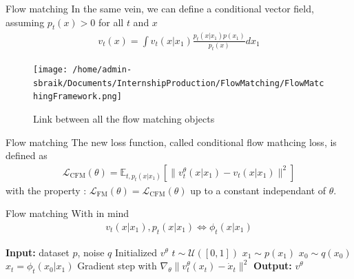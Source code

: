 \documentclass{beamer}
\begin{document}
\begin{frame}{Flow matching}
    In the same vein, we can define a conditional vector field, assuming \(p_t(x)>0\) for all \(t\) and \(x\)
    \begin{align}
        v_t(x)=\int v_t(x|x_1)\frac{p_t(x|x_1)p(x_1)}{p_t(x)}dx_1
    \end{align}
\end{frame}

\begin{frame}
\begin{figure}
    \centering
    \texttt{[image: /home/admin-sbraik/Documents/InternshipProduction/FlowMatching/FlowMatchingFramework.png]}
    \caption{Link between all the flow matching objects}
    \label{fig:flow_matching_full}
\end{figure}
\end{frame}

\begin{frame}{Flow matching}
    The new loss function, called conditional flow mathcing loss, is defined as
    \begin{align}
        \mathcal{L}_\text{CFM}(\theta)=\mathbb{E}_{t,p_t(x|x_1)}\left[ \| v_t^\theta(x|x_1)-v_t(x|x_1)\|^2 \right]
    \end{align}
    with the property : \( \mathcal{L}_\text{FM}(\theta)=\mathcal{L}_\text{CFM}(\theta) \) up to a constant independant of \(\theta\).
\end{frame}


\begin{frame}{Flow matching}
    With in mind 
    \begin{align*}
        v_t(x|x_1),p_t(x|x_1)\iff \phi_t(x|x_1)
    \end{align*}
    \begin{algorithm}[H]
        \caption{Flow matching training}\label{alg:flow_matching_training}
            \begin{algorithmic}
                \State \textbf{Input:} dataset \(p\), noise \(q\)
                \State Initialized \(v^\theta\)
                    \State \(t\sim\mathcal{U}([0,1])\)
                    \State \(x_1\sim p(x_1)\)
                    \State \(x_0\sim q(x_0)\)
                    \State \(x_t=\phi_t(x_0|x_1)\)
                    \State Gradient step with \(\nabla_\theta \| v_t^\theta (x_t) -\dot{x}_t \|^2\)
                \EndWhile
                \State \textbf{Output:} \(v^\theta\)
            \end{algorithmic}
        \end{algorithm}
\end{frame}
\end{document}
